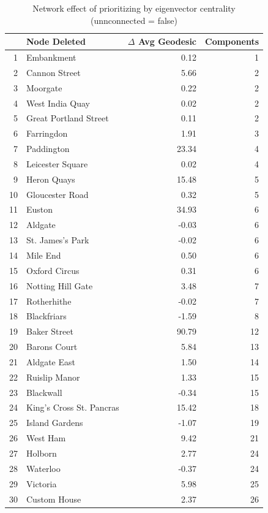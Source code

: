 \documentclass[11pt]{article} %
\begin{document}
\begin{table}[htbp]
\centering
\begin{tabular}{|r|l|r|r|}
\hline
\multicolumn{1}{|l|}{} & Node Deleted & \multicolumn{1}{l|}{$\Delta$ Avg Geodesic} & \multicolumn{1}{l|}{Components} \\ \hline
1 & Embankment & 0.12 & 1 \\ 
2 & Cannon Street & 5.66 & 2 \\ 
3 & Moorgate & 0.22 & 2 \\ 
4 & West India Quay & 0.02 & 2 \\ 
5 & Great Portland Street & 0.11 & 2 \\ 
6 & Farringdon & 1.91 & 3 \\ 
7 & Paddington & 23.34 & 4 \\ 
8 & Leicester Square & 0.02 & 4 \\ 
9 & Heron Quays & 15.48 & 5 \\ 
10 & Gloucester Road & 0.32 & 5 \\ 
11 & Euston & 34.93 & 6 \\ 
12 & Aldgate & -0.03 & 6 \\ 
13 & St. James's Park & -0.02 & 6 \\ 
14 & Mile End & 0.50 & 6 \\ 
15 & Oxford Circus & 0.31 & 6 \\ 
16 & Notting Hill Gate & 3.48 & 7 \\ 
17 & Rotherhithe & -0.02 & 7 \\ 
18 & Blackfriars & -1.59 & 8 \\ 
19 & Baker Street & 90.79 & 12 \\ 
20 & Barons Court & 5.84 & 13 \\ 
21 & Aldgate East & 1.50 & 14 \\ 
22 & Ruislip Manor & 1.33 & 15 \\ 
23 & Blackwall & -0.34 & 15 \\ 
24 & King's Cross St. Pancras & 15.42 & 18 \\ 
25 & Island Gardens & -1.07 & 19 \\ 
26 & West Ham & 9.42 & 21 \\ 
27 & Holborn & 2.77 & 24 \\ 
28 & Waterloo & -0.37 & 24 \\ 
29 & Victoria & 5.98 & 25 \\ 
30 & Custom House & 2.37 & 26 \\ \hline
\end{tabular}
\caption{Network effect of prioritizing  by eigenvector centrality \\ (unnconnected = false)}
\label{eig true}
\end{table}
\end{document}
